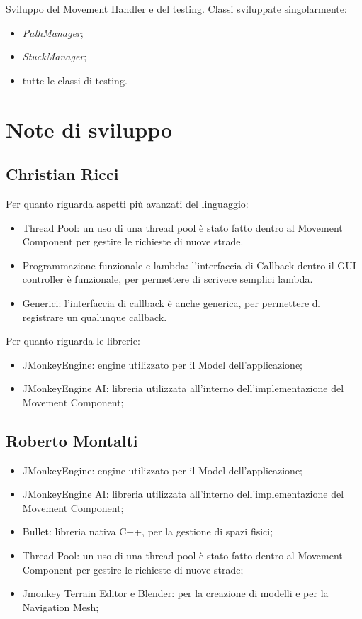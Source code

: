 Sviluppo del Movement Handler e del testing.
Classi sviluppate singolarmente:
\begin{itemize}
    \item \emph{PathManager};
    \item \emph{StuckManager};
    \item tutte le classi di testing.
\end{itemize}

\section{Note di sviluppo}

\subsection{Christian Ricci}

Per quanto riguarda aspetti più avanzati del linguaggio:
\begin{itemize}
\item Thread Pool: un uso di una thread pool è stato fatto dentro al Movement Component per gestire le richieste di nuove strade.
\item Programmazione funzionale e lambda: l'interfaccia di Callback dentro il GUI controller è funzionale, per permettere di scrivere semplici lambda.
\item Generici: l'interfaccia di callback è anche generica, per permettere di registrare un qualunque callback.
\end{itemize}

Per quanto riguarda le librerie:
\begin{itemize}
\item JMonkeyEngine: engine utilizzato per il Model dell'applicazione;
\item JMonkeyEngine AI: libreria utilizzata all'interno dell'implementazione del Movement Component;
\end{itemize}

\subsection{Roberto Montalti}

\begin{itemize}
\item JMonkeyEngine: engine utilizzato per il Model dell'applicazione;
\item JMonkeyEngine AI: libreria utilizzata all'interno dell'implementazione del Movement Component;
\item Bullet: libreria nativa C++, per la gestione di spazi fisici;
\item Thread Pool: un uso di una thread pool è stato fatto dentro al Movement Component per gestire le richieste di nuove strade;
\item Jmonkey Terrain Editor e Blender: per la creazione di modelli e per la Navigation Mesh; 
\end{itemize}

